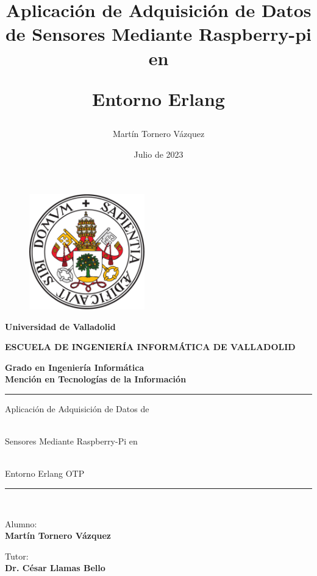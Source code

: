 \documentclass[openright,twoside,12pt]{book}
\date{Julio de 2023}
\author{Martín Tornero Vázquez}
\title{Aplicación de Adquisición de Datos de Sensores Mediante 
Raspberry-pi en \strut{}Entorno Erlang}
\begin{document}
\begin{titlepage}

\begin{center}
\vspace*{-2cm}
\begin{figure}[htb]
\begin{center}
\includegraphics[width=5cm]{images/escudo_uva.png}
\end{center}
\end{figure}
\begin{large}
\textbf{Universidad de Valladolid}
\end{large}

\vspace*{1cm}

\begin{large}
\textbf{ESCUELA DE INGENIERÍA INFORMÁTICA DE VALLADOLID}

\end{large}
\vspace*{0.5cm}
{\sc \textbf{ Grado en Ingeniería Informática}\\
	\textbf{Mención en Tecnologías de la Información}}

\vspace*{1.5cm}
\rule{\textwidth}{0.1mm}
{\huge\sc Aplicación de Adquisición de Datos de\strut\\
          Sensores Mediante Raspberry-Pi en\strut\\
          Entorno Erlang OTP}
\vspace*{1cm}
\rule{\textwidth}{0.1mm}\\
\vspace*{3cm}
\begin{large}
\begin{flushright}
Alumno:\\
\textbf{Martín Tornero Vázquez}

\vspace*{0.3in}
Tutor:\\
\textbf{Dr. César Llamas Bello}%
\end{flushright}
\end{large}
\end{center}

\end{titlepage}
\cleardoublepage
\end{document}

